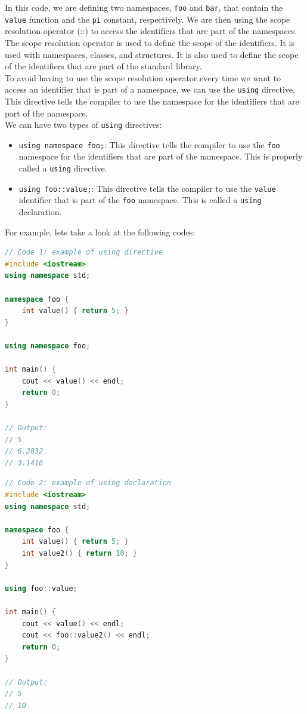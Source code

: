 In this code, we are defining two namespaces, \texttt{foo} and \texttt{bar}, that contain the \texttt{value}
function and the \texttt{pi} constant, respectively. We are then using the scope resolution operator (::) to
access the identifiers that are part of the namespaces.\\

The scope resolution operator is used to define the scope of the identifiers. It is used with namespaces, classes,
and structures. It is also used to define the scope of the identifiers that are part of the standard library.\\

To avoid having to use the scope resolution operator every time we want to access an identifier that is part of a
namespace, we can use the \texttt{using} directive. This directive tells the compiler to use the namespace for the
identifiers that are part of the namespace.\\

We can have two types of \texttt{using} directives:

\begin{itemize}
    \item \texttt{using namespace foo;}: This directive tells the compiler to use the \texttt{foo} namespace for
    the identifiers that are part of the namespace. This is properly called a \texttt{using} directive.
    \item \texttt{using foo::value;}: This directive tells the compiler to use the \texttt{value} identifier that
    is part of the \texttt{foo} namespace. This is called a \texttt{using} declaration.
\end{itemize}

For example, lets take a look at the following codes:

\begin{lstlisting}[language=C++]
// Code 1: example of using directive
#include <iostream>
using namespace std;

namespace foo {
    int value() { return 5; }
}

using namespace foo;

int main() {
    cout << value() << endl;
    return 0;
}

// Output:
// 5
// 6.2832
// 3.1416
\end{lstlisting}

\begin{lstlisting}[language=C++]
// Code 2: example of using declaration
#include <iostream>
using namespace std;

namespace foo {
    int value() { return 5; }
    int value2() { return 10; }
}

using foo::value;

int main() {
    cout << value() << endl;
    cout << foo::value2() << endl;
    return 0;
}

// Output:
// 5
// 10
\end{lstlisting}

